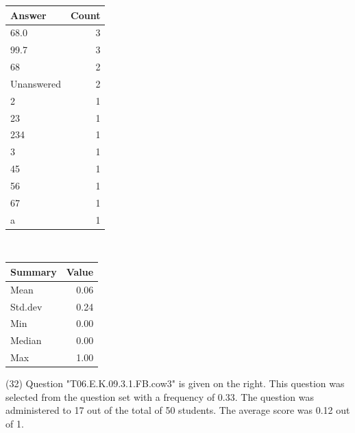 \documentclass[12pt,english,nohyper]{tufte-handout}\usepackage[]{graphicx}\usepackage[]{color}
\begin{document}
\begin{center}%
\begin{tabular}{lr}
  \hline
Answer & Count \\ 
  \hline
68.0 &   3 \\ 
  99.7 &   3 \\ 
  68 &   2 \\ 
  Unanswered &   2 \\ 
  2 &   1 \\ 
  23 &   1 \\ 
  234 &   1 \\ 
  3 &   1 \\ 
  45 &   1 \\ 
  56 &   1 \\ 
  67 &   1 \\ 
  a &   1 \\ 
   \hline
\end{tabular}
~~~~~~~~%
\begin{tabular}{lr}
  \hline
Summary & Value \\ 
  \hline
Mean & 0.06 \\ 
  Std.dev & 0.24 \\ 
  Min & 0.00 \\ 
  Median & 0.00 \\ 
  Max & 1.00 \\ 
   \hline
\end{tabular}
\end{center}\newpage{} (32) Question "T06.E.K.09.3.1.FB.cow3" is given on the right. This question was selected from the question set with a frequency of 0.33. The question was administered to 17 out of the total of 50 students. The average score was 0.12 out of 1.
\end{document}
